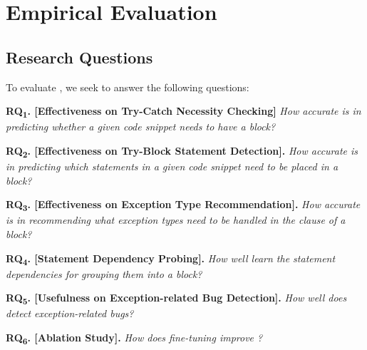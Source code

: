 \vspace{-8pt}
\section{Empirical Evaluation}
\label{sec:eval}

\subsection{Research Questions}

To evaluate {\tool}, we seek to answer the following questions:

\vspace{2pt}

\noindent \textbf{RQ\textsubscript{1}. [Effectiveness on Try-Catch
    Necessity Checking]} {\em How accurate is {\tool} in predicting
  whether a given code snippet needs to have a 
  block?}
    


\vspace{2pt}
\noindent \textbf{RQ\textsubscript{2}. [Effectiveness on Try-Block
    Statement Detection].} {\em How accurate is {\tool} in predicting
  which statements in a given code snippet need to be placed in a
   block?}


\vspace{2pt}
\noindent \textbf{RQ\textsubscript{3}. [Effectiveness on Exception Type Recommendation].}
{\em How accurate is {\tool} in recommending what exception types need to be handled in the  clause of a  block?}

\vspace{2pt}
\noindent \textbf{RQ\textsubscript{4}. [Statement Dependency Probing].}
{\em How well {\tool} learn the statement dependencies for grouping them into a  block?}

\vspace{2pt}
\noindent \textbf{RQ\textsubscript{5}. [Usefulness on
    Exception-related Bug Detection].}  {\em How well does {\tool}
  detect exception-related bugs?}

\vspace{2pt}
\noindent \textbf{RQ\textsubscript{6}. [Ablation Study].} {\em How does
 fine-tuning improve {\tool}?}




